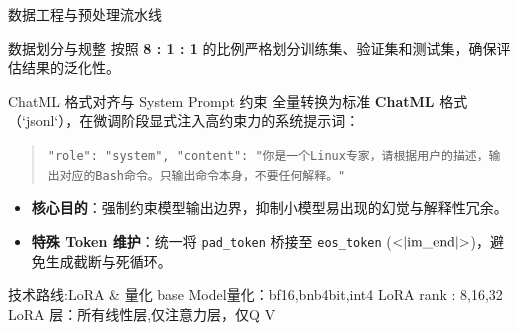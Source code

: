 \documentclass[aspectratio=169]{beamer}
\begin{document}
\begin{frame}{数据工程与预处理流水线}
    \begin{block}{数据划分与规整}
        按照 \textbf{8 : 1 : 1} 的比例严格划分训练集、验证集和测试集，确保评估结果的泛化性。
    \end{block}

    \begin{block}{ChatML 格式对齐与 System Prompt 约束}
        全量转换为标准 \textbf{ChatML} 格式（`jsonl`），在微调阶段显式注入高约束力的系统提示词：
        \vspace{0.2cm}
        \begin{quote}
            \small
            \color{darkgray}
            \texttt{"role": "system", "content": "你是一个Linux专家，请根据用户的描述，输出对应的Bash命令。只输出命令本身，不要任何解释。"}
        \end{quote}
        \vspace{0.2cm}
        \begin{itemize}
            \item \textbf{核心目的}：强制约束模型输出边界，抑制小模型易出现的幻觉与解释性冗余。
            \item \textbf{特殊 Token 维护}：统一将 \texttt{pad\_token} 桥接至 \texttt{eos\_token} ($\text{\textless|im\_end|\textgreater}$)，避免生成截断与死循环。
        \end{itemize}
    \end{block}
\end{frame}

\begin{frame}{技术路线:LoRA \& 量化}
  base Model量化：bf16,bnb4bit,int4
  LoRA rank : 8,16,32
  LoRA 层：所有线性层,仅注意力层，仅Q V
\end{frame}
\end{document}
